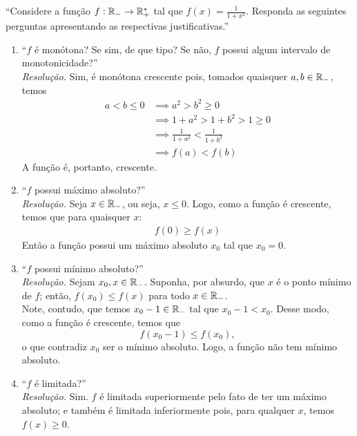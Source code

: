 \enquote{Considere a função $f: \mathbb R_- \rightarrow \mathbb R_+^*$ tal que $f(x) = \frac{1}{1 + x^2}$. Responda as seguintes perguntas apresentando as respectivas justificativas.}
\begin{enumerate}
    \item \enquote{$f$ é monótona? Se sim, de que tipo? Se não, $f$ possui algum intervalo de monotonicidade?} \\
    \emph{Resolução.} Sim, é monótona crescente pois, tomados quaisquer $a, b \in \mathbb R_-$, temos
    \begin{align*}
        a < b \le 0 & \implies a^2 > b^2 \ge 0 \\ & \implies
        1 + a^2 > 1 + b^2 > 1 \ge 0 \\ & \implies
        \frac{1}{1 + a^2} < \frac{1}{1 + b^2} \\ & \implies
        f(a) < f(b)
    \end{align*}
    A função é, portanto, crescente.
    \item \enquote{$f$ possui máximo absoluto?} \\
    \emph{Resolução.} Seja $x \in \mathbb R_-$, ou seja, $x \le 0$. Logo, como a função é crescente, temos que para quaisquer $x$:
    \begin{align*}
        f(0) \ge f(x)
    \end{align*}
    Então a função possui um máximo absoluto $x_0$ tal que  $x_0 = 0$. 
    \item \enquote{$f$ possui mínimo absoluto?} \\
    \emph{Resolução.} Sejam $x_0, x \in \mathbb R_-$. Suponha, por absurdo, que $x$ é o ponto mínimo de $f$; então, $f(x_0) \le f(x)$ para todo $x \in \mathbb R_-$. \\ Note, contudo, que temos $x_0 -1 \in \mathbb R_-$ tal que $x_0 -1 < x_0$. Desse modo, como a função é crescente, temos que
    \begin{displaymath}
        f(x_0 - 1) \le f(x_0),
    \end{displaymath}
    o que contradiz $x_0$ ser o mínimo absoluto. Logo, a função não tem mínimo absoluto.
    \item \enquote{$f$ é limitada?} \\
    \emph{Resolução.} Sim. $f$ é limitada superiormente pelo fato de ter um máximo absoluto; e também é limitada inferiormente pois, para qualquer $x$, temos $f(x) \ge 0$.
\end{enumerate}